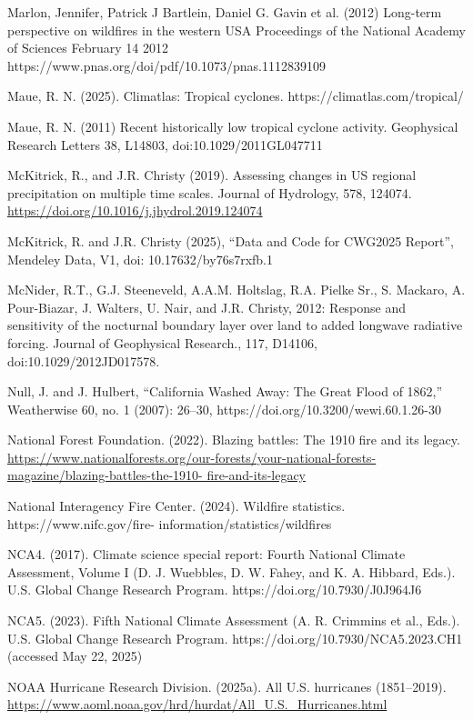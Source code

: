 \documentclass[12pt,paper=a4,DIV=12,parskip=never,chapterprefix=false,headings=standardclasses]{scrreprt}
\begin{document}
Marlon, Jennifer, Patrick J Bartlein, Daniel G. Gavin et al. (2012) Long-term perspective on wildfires in
the western USA Proceedings of the National Academy of Sciences February 14 2012
https://www.pnas.org/doi/pdf/10.1073/pnas.1112839109

Maue, R. N. (2025). Climatlas: Tropical cyclones. https://climatlas.com/tropical/

Maue, R. N. (2011) Recent historically low tropical cyclone activity. Geophysical Research Letters 38,
L14803, doi:10.1029/2011GL047711

McKitrick, R., and J.R. Christy (2019). Assessing changes in US regional precipitation on multiple time
scales. Journal of Hydrology, 578, 124074. \url{https://doi.org/10.1016/j.jhydrol.2019.124074}

McKitrick, R. and J.R. Christy (2025), “Data and Code for CWG2025 Report”, Mendeley Data, V1, doi:
10.17632/by76s7rxfb.1

McNider, R.T., G.J. Steeneveld, A.A.M. Holtslag, R.A. Pielke Sr., S. Mackaro, A. Pour-Biazar, J.
Walters, U. Nair, and J.R. Christy, 2012: Response and sensitivity of the nocturnal boundary layer
over land to added longwave radiative forcing. Journal of Geophysical Research., 117, D14106,
doi:10.1029/2012JD017578.

Null, J. and J. Hulbert, “California Washed Away: The Great Flood of 1862,” Weatherwise 60, no. 1
(2007): 26–30, https://doi.org/10.3200/wewi.60.1.26-30

National Forest Foundation. (2022). Blazing battles: The 1910 fire and its legacy.
\url{https://www.nationalforests.org/our-forests/your-national-forests-magazine/blazing-battles-the-1910-
fire-and-its-legacy}

National Interagency Fire Center. (2024). Wildfire statistics. https://www.nifc.gov/fire-
information/statistics/wildfires

NCA4. (2017). Climate science special report: Fourth National Climate Assessment, Volume I (D. J.
Wuebbles, D. W. Fahey, and K. A. Hibbard, Eds.). U.S. Global Change Research Program.
https://doi.org/10.7930/J0J964J6

NCA5. (2023). Fifth National Climate Assessment (A. R. Crimmins et al., Eds.). U.S. Global Change
Research Program. https://doi.org/10.7930/NCA5.2023.CH1 (accessed May 22, 2025)

NOAA Hurricane Research Division. (2025a). All U.S. hurricanes (1851–2019).
\url{https://www.aoml.noaa.gov/hrd/hurdat/All_U.S._Hurricanes.html}
\end{document}
